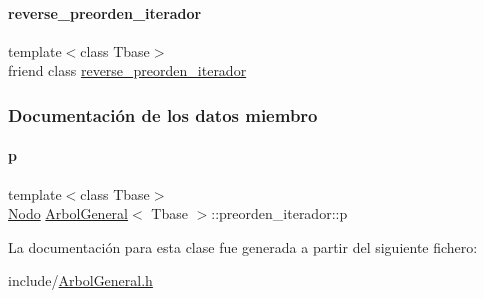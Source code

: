 \paragraph{\texorpdfstring{reverse\+\_\+preorden\+\_\+iterador}{reverse\_preorden\_iterador}}
{\footnotesize\ttfamily template$<$class Tbase$>$ \\
friend class \hyperlink{classArbolGeneral_1_1reverse__preorden__iterador}{reverse\+\_\+preorden\+\_\+iterador}\hspace{0.3cm}{\ttfamily [friend]}}



\subsubsection{Documentación de los datos miembro}
\hypertarget{classArbolGeneral_1_1preorden__iterador_afac01ba5fdc1e10c2a808d92f1dbddaf}{}\label{classArbolGeneral_1_1preorden__iterador_afac01ba5fdc1e10c2a808d92f1dbddaf} 
\paragraph{\texorpdfstring{p}{p}}
{\footnotesize\ttfamily template$<$class Tbase$>$ \\
\hyperlink{classArbolGeneral_a12cc1b74a9095d89bc7334290d332f7a}{Nodo} \hyperlink{classArbolGeneral}{Arbol\+General}$<$ Tbase $>$\+::preorden\+\_\+iterador\+::p\hspace{0.3cm}{\ttfamily [private]}}



La documentación para esta clase fue generada a partir del siguiente fichero\+:\begin{DoxyCompactItemize}
\item 
include/\hyperlink{ArbolGeneral_8h}{Arbol\+General.\+h}\end{DoxyCompactItemize}
